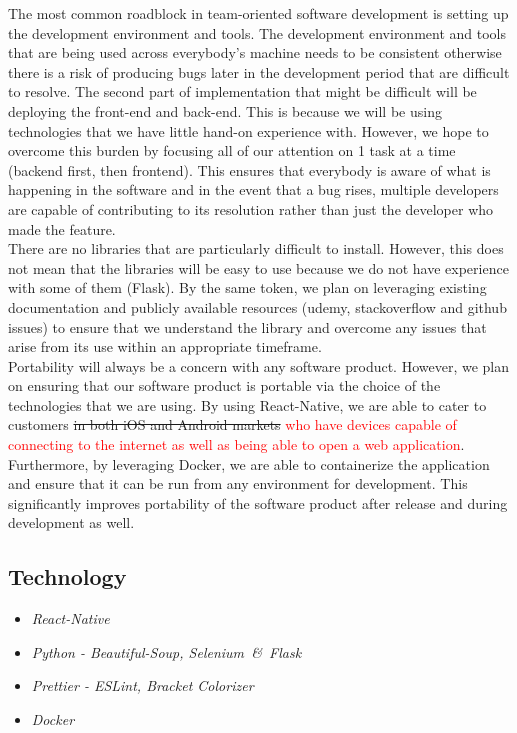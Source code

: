 \documentclass[11pt, oneside]{article}   	%
\begin{document}
The most common roadblock in team-oriented software development is setting up the development environment and tools. The development environment and tools that are being used across everybody's machine needs to be consistent otherwise there is a risk of producing bugs later in the development period that are difficult to resolve.
The second part of implementation that might be difficult will be deploying the front-end and back-end. This is because we will be using technologies that we have little hand-on experience with. However, we hope to overcome this burden by focusing all of our attention on 1 task at a time (backend first, then frontend). This ensures that everybody is aware of what is happening in the software and in the event that a bug rises, multiple developers are capable of contributing to its resolution rather than just the developer who made the feature.\\

There are no libraries that are particularly difficult to install. However, this does not mean that the libraries will be easy to use because we do not have experience with some of them (Flask). By the same token, we plan on leveraging existing documentation and publicly available resources (udemy, stackoverflow and github issues) to ensure that we understand the library and overcome any issues that arise from its use within an appropriate timeframe.\\

Portability will always be a concern with any software product. However, we plan on ensuring that our software product is portable via the choice of the technologies that we are using. By using React-Native, we are able to cater to customers \sout{in both iOS and Android markets} \textcolor{red}{who have devices capable of connecting to the internet as well as being able to open a web application}. Furthermore, by leveraging Docker, we are able to containerize the application and ensure that it can be run from any environment for development. This significantly improves portability of the software product after release and during development as well.\\

\newpage
\subsection*{Technology}

\begin{itemize}
\item \it React-Native
\item \it Python - Beautiful-Soup, Selenium\ \&\ Flask
\item \it Prettier - ESLint, Bracket Colorizer
\item \it Docker
\end{itemize}
\end{document}
